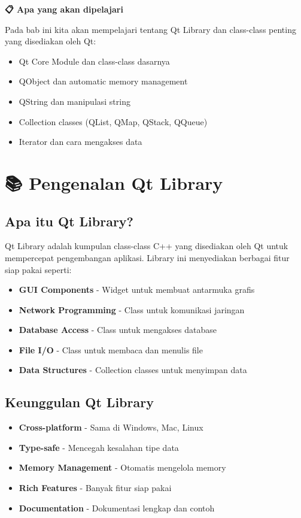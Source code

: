 \textbf{📋 Apa yang akan dipelajari}

Pada bab ini kita akan mempelajari tentang Qt Library dan class-class penting yang disediakan oleh Qt:

\begin{itemize}
\item Qt Core Module dan class-class dasarnya
\item QObject dan automatic memory management
\item QString dan manipulasi string
\item Collection classes (QList, QMap, QStack, QQueue)
\item Iterator dan cara mengakses data
\end{itemize}

\minitoc

\section{📚 Pengenalan Qt Library}

\subsection{Apa itu Qt Library?}

Qt Library adalah kumpulan class-class C++ yang disediakan oleh Qt untuk mempercepat pengembangan aplikasi. Library ini menyediakan berbagai fitur siap pakai seperti:

\begin{itemize}
\item \textbf{GUI Components} - Widget untuk membuat antarmuka grafis
\item \textbf{Network Programming} - Class untuk komunikasi jaringan
\item \textbf{Database Access} - Class untuk mengakses database
\item \textbf{File I/O} - Class untuk membaca dan menulis file
\item \textbf{Data Structures} - Collection classes untuk menyimpan data
\end{itemize}

\subsection{Keunggulan Qt Library}

\begin{itemize}
\item \textbf{Cross-platform} - Sama di Windows, Mac, Linux
\item \textbf{Type-safe} - Mencegah kesalahan tipe data
\item \textbf{Memory Management} - Otomatis mengelola memory
\item \textbf{Rich Features} - Banyak fitur siap pakai
\item \textbf{Documentation} - Dokumentasi lengkap dan contoh
\end{itemize}

